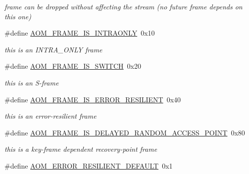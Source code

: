 \begin{DoxyCompactItemize}
\begin{DoxyCompactList}\small\item\em frame can be dropped without affecting the stream (no future frame depends on this one) \end{DoxyCompactList}\item 
\#define \hyperlink{group__encoder_ga5ffee67363a67d56654926d49e98b7d4}{A\+O\+M\+\_\+\+F\+R\+A\+M\+E\+\_\+\+I\+S\+\_\+\+I\+N\+T\+R\+A\+O\+N\+LY}~0x10\hypertarget{group__encoder_ga5ffee67363a67d56654926d49e98b7d4}{}\label{group__encoder_ga5ffee67363a67d56654926d49e98b7d4}

\begin{DoxyCompactList}\small\item\em this is an I\+N\+T\+R\+A\+\_\+\+O\+N\+LY frame \end{DoxyCompactList}\item 
\#define \hyperlink{group__encoder_gadcd30e5b2e9f025d38c733d90c0b651c}{A\+O\+M\+\_\+\+F\+R\+A\+M\+E\+\_\+\+I\+S\+\_\+\+S\+W\+I\+T\+CH}~0x20\hypertarget{group__encoder_gadcd30e5b2e9f025d38c733d90c0b651c}{}\label{group__encoder_gadcd30e5b2e9f025d38c733d90c0b651c}

\begin{DoxyCompactList}\small\item\em this is an S-\/frame \end{DoxyCompactList}\item 
\#define \hyperlink{group__encoder_ga38c20192519a602646b9121c66dc0e70}{A\+O\+M\+\_\+\+F\+R\+A\+M\+E\+\_\+\+I\+S\+\_\+\+E\+R\+R\+O\+R\+\_\+\+R\+E\+S\+I\+L\+I\+E\+NT}~0x40\hypertarget{group__encoder_ga38c20192519a602646b9121c66dc0e70}{}\label{group__encoder_ga38c20192519a602646b9121c66dc0e70}

\begin{DoxyCompactList}\small\item\em this is an error-\/resilient frame \end{DoxyCompactList}\item 
\#define \hyperlink{group__encoder_ga42450a4820d734d42acd9fa99dcf5768}{A\+O\+M\+\_\+\+F\+R\+A\+M\+E\+\_\+\+I\+S\+\_\+\+D\+E\+L\+A\+Y\+E\+D\+\_\+\+R\+A\+N\+D\+O\+M\+\_\+\+A\+C\+C\+E\+S\+S\+\_\+\+P\+O\+I\+NT}~0x80\hypertarget{group__encoder_ga42450a4820d734d42acd9fa99dcf5768}{}\label{group__encoder_ga42450a4820d734d42acd9fa99dcf5768}

\begin{DoxyCompactList}\small\item\em this is a key-\/frame dependent recovery-\/point frame \end{DoxyCompactList}\item 
\#define \hyperlink{group__encoder_ga4118658e1fc1590f72fec38478ae230d}{A\+O\+M\+\_\+\+E\+R\+R\+O\+R\+\_\+\+R\+E\+S\+I\+L\+I\+E\+N\+T\+\_\+\+D\+E\+F\+A\+U\+LT}~0x1\hypertarget{group__encoder_ga4118658e1fc1590f72fec38478ae230d}{}\label{group__encoder_ga4118658e1fc1590f72fec38478ae230d}


\end{DoxyCompactItemize}
